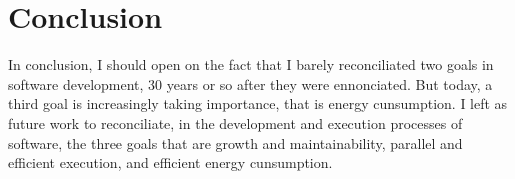 \chapter{Conclusion} \label{chapter:conclusion}

In conclusion, I should open on the fact that I barely reconciliated two goals in software development, 30 years or so after they were ennonciated.
But today, a third goal is increasingly taking importance, that is energy cunsumption.
I left as future work to reconciliate, in the development and execution processes of software, the three goals that are growth and maintainability, parallel and efficient execution, and efficient energy cunsumption.